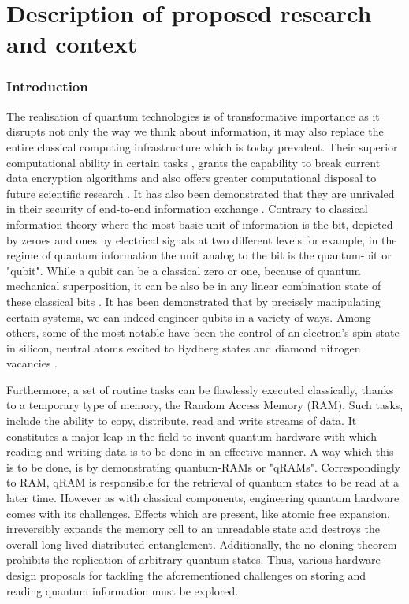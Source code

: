 \documentclass{epsrc}
\begin{document}
\part{Description of proposed research and context}

\vspace{4pt}

\section{Introduction}

The realisation of quantum technologies is of transformative importance as it disrupts not only the way we think about information, it may also replace the entire classical computing infrastructure which is today prevalent. Their superior computational ability in certain tasks , grants the capability to break current data encryption algorithms  and also offers greater computational disposal to future scientific research . It has also been demonstrated that they are unrivaled in their security of end-to-end information exchange . Contrary to classical information theory where the most basic unit of information is the bit, depicted by zeroes and ones by electrical signals at two different levels for example, in the regime of quantum information the unit analog to the bit is the quantum-bit or "qubit". While a qubit can be a classical zero or one, because of quantum mechanical superposition, it can be also be in any linear combination state of these classical bits . It has been demonstrated that by precisely manipulating certain systems, we can indeed engineer qubits in a variety of ways. Among others, some of the most notable have been the control of an electron's spin state in silicon, neutral atoms excited to Rydberg states and diamond nitrogen vacancies . 

Furthermore, a set of routine tasks can be flawlessly executed classically, thanks to a temporary type of memory, the Random Access Memory (RAM). Such tasks, include the ability to copy, distribute, read and write streams of data. It constitutes a major leap in the field to invent quantum hardware with which reading and writing data is to be done in an effective manner. A way which this is to be done, is by demonstrating quantum-RAMs or "qRAMs". Correspondingly to RAM, qRAM is responsible for the retrieval of quantum states to be read at a later time. However as with classical components, engineering quantum hardware comes with its challenges. Effects which are present, like atomic free expansion, irreversibly expands the memory cell to an unreadable state and destroys the overall long-lived distributed entanglement. Additionally, the no-cloning theorem prohibits the replication of arbitrary quantum states. Thus, various hardware design proposals for tackling the aforementioned challenges on storing and reading quantum information must be explored. 
\end{document}

